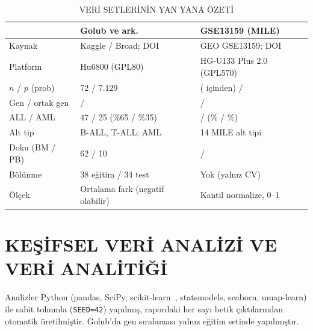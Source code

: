 \documentclass[conference]{IEEEtran}
\begin{document}
\begin{table}[!t]
\caption{VERİ SETLERİNİN YAN YANA ÖZETİ}\label{tab:data}
\centering\scriptsize\setlength{\tabcolsep}{2pt}
\begin{tabular}{@{}lll@{}}
\toprule
 & \textbf{Golub ve ark.~\cite{golub1999}} & \textbf{GSE13159 (MILE)~\cite{haferlach2010}}\\
\midrule
Kaynak & Kaggle / Broad; DOI & GEO GSE13159; DOI\\
Platform & Hu6800 (GPL80) & HG-U133 Plus 2.0 (GPL570)\\
$n$ / $p$ (prob) & 72 / 7.129 & \SnTR{} (\StotalTR{} içinden) / \SpTR{}\\
Gen / ortak gen & \SgolubGTR{} / \ScommonGTR{} & \SgseGTR{} / \ScommonGTR{}\\
ALL / AML & 47 / 25 (\%65 / \%35) & \SnALLTR{} / \SnAMLTR{} (\%\SallPctTR{} / \%\SamlPctTR{})\\
Alt tip & B-ALL, T-ALL; AML & 14 MILE alt tipi\\
Doku (BM / PB) & 62 / 10 & \SbmNTR{} / \SpbNTR{}\\
Bölünme & 38 eğitim / 34 test & Yok (yalnız CV)\\
Ölçek & Ortalama fark (negatif olabilir) & Kantil normalize, 0--1\\
\bottomrule
\end{tabular}
\end{table}

\section{KEŞİFSEL VERİ ANALİZİ VE VERİ ANALİTİĞİ}\label{sec:eda}
Analizler Python (pandas, SciPy, scikit-learn~\cite{pedregosa2011}, statsmodels, seaborn, umap-learn) ile sabit tohumla (\texttt{SEED=42}) yapılmış, rapordaki her sayı betik çıktılarından otomatik üretilmiştir. Golub'da gen sıralaması yalnız eğitim setinde yapılmıştır.
\end{document}
